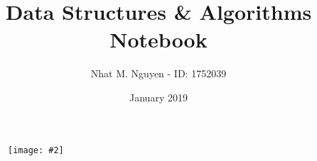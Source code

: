 \documentclass[9pt, landscape, a4paper]{article}
\title{\vspace{-4ex}\Large{Data Structures \& Algorithms Notebook}}
\author{Nhat M. Nguyen - ID: 1752039}
\date{January 2019}
\newcommand{\img}[2][]
  {
    \begin{figure}[H]
      \centering
      \texttt{[image: \#2]}
    \end{figure}
  }
\begin{document}
  \maketitle
  \img[width=3cm]{logo.jpeg}
  \setcounter{tocdepth}{2}
  
  \begin{multicols}{2}
    \tableofcontents
  \end{multicols}

  \clearpage
    \begin{multicols}{2}
      
    \end{multicols}
\end{document}
